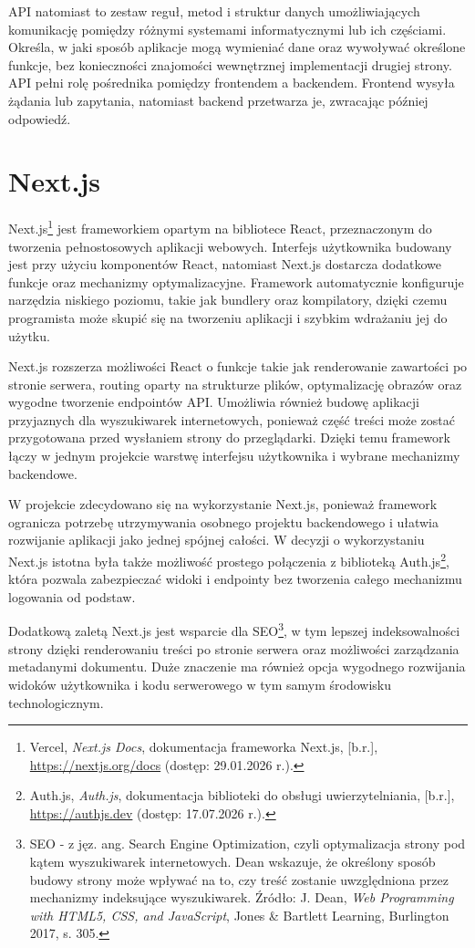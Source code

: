 \documentclass[12pt,a4paper,twoside]{report}
\newcommand{\FirstParagraph}{\noindent\ignorespaces}
\begin{document}
API natomiast to zestaw reguł, metod i struktur danych umożliwiających komunikację pomiędzy różnymi systemami informatycznymi lub ich częściami. Określa, w jaki sposób aplikacje mogą wymieniać dane oraz wywoływać określone funkcje, bez konieczności znajomości wewnętrznej implementacji drugiej strony. API pełni rolę pośrednika pomiędzy frontendem a backendem. Frontend wysyła żądania lub zapytania, natomiast backend przetwarza je, zwracając później odpowiedź.

\section{Next.js}

\FirstParagraph Next.js\footnote{Vercel, \emph{Next.js Docs}, dokumentacja frameworka Next.js, [b.r.], \url{https://nextjs.org/docs} (dostęp: 29.01.2026 r.).} jest frameworkiem opartym na bibliotece React, przeznaczonym do tworzenia pełnostosowych aplikacji webowych. Interfejs użytkownika budowany jest przy użyciu komponentów React, natomiast Next.js dostarcza dodatkowe funkcje oraz mechanizmy optymalizacyjne. Framework automatycznie konfiguruje narzędzia niskiego poziomu, takie jak bundlery oraz kompilatory, dzięki czemu programista może skupić się na tworzeniu aplikacji i szybkim wdrażaniu jej do użytku.

Next.js rozszerza możliwości React o funkcje takie jak renderowanie zawartości po stronie serwera, routing oparty na strukturze plików, optymalizację obrazów oraz wygodne tworzenie endpointów API. Umożliwia również budowę aplikacji przyjaznych dla wyszukiwarek internetowych, ponieważ część treści może zostać przygotowana przed wysłaniem strony do przeglądarki. Dzięki temu framework łączy w jednym projekcie warstwę interfejsu użytkownika i wybrane mechanizmy backendowe.

W projekcie zdecydowano się na wykorzystanie Next.js, ponieważ framework ogranicza potrzebę utrzymywania osobnego projektu backendowego i ułatwia rozwijanie aplikacji jako jednej spójnej całości. W decyzji o wykorzystaniu Next.js istotna była także możliwość prostego połączenia z biblioteką Auth.js\footnote{Auth.js, \emph{Auth.js}, dokumentacja biblioteki do obsługi uwierzytelniania, [b.r.], \url{https://authjs.dev} (dostęp: 17.07.2026 r.).}, która pozwala zabezpieczać widoki i endpointy bez tworzenia całego mechanizmu logowania od podstaw.

Dodatkową zaletą Next.js jest wsparcie dla SEO\footnote{SEO - z jęz. ang. Search Engine Optimization, czyli optymalizacja strony pod kątem wyszukiwarek internetowych. Dean wskazuje, że określony sposób budowy strony może wpływać na to, czy treść zostanie uwzględniona przez mechanizmy indeksujące wyszukiwarek. Źródło: J. Dean, \emph{Web Programming with HTML5, CSS, and JavaScript}, Jones \& Bartlett Learning, Burlington 2017, s. 305.}, w tym lepszej indeksowalności strony dzięki renderowaniu treści po stronie serwera oraz możliwości zarządzania metadanymi dokumentu. Duże znaczenie ma również opcja wygodnego rozwijania widoków użytkownika i kodu serwerowego w tym samym środowisku technologicznym.
\end{document}

